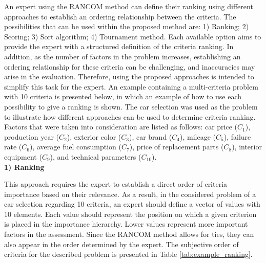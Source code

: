 An expert using the RANCOM method can define their ranking using different approaches to establish an ordering relationship between the criteria. The possibilities that can be used within the proposed method are: 1) Ranking; 2) Scoring; 3) Sort algorithm; 4) Tournament method. Each available option aims to provide the expert with a structured definition of the criteria ranking. In addition, as the number of factors in the problem increases, establishing an ordering relationship for these criteria can be challenging, and inaccuracies may arise in the evaluation. Therefore, using the proposed approaches is intended to simplify this task for the expert. An example containing a multi-criteria problem with 10 criteria is presented below, in which an example of how to use each possibility to give a ranking is shown. The car selection was used as the problem to illustrate how different approaches can be used to determine criteria ranking. Factors that were taken into consideration are listed as follows: car price ($C_{1}$), production year ($C_{2}$), exterior color ($C_{3}$), car brand ($C_{4}$), mileage ($C_{5}$), failure rate ($C_{6}$), average fuel consumption ($C_{7}$), price of replacement parts ($C_{8}$), interior equipment ($C_{9}$), and technical parameters ($C_{10}$). \\

\noindent \textbf{1) Ranking}

This approach requires the expert to establish a direct order of criteria importance based on their relevance. As a result, in the considered problem of a car selection regarding 10 criteria, an expert should define a vector of values with 10 elements. Each value should represent the position on which a given criterion is placed in the importance hierarchy. Lower values represent more important factors in the assessment. Since the RANCOM method allows for ties, they can also appear in the order determined by the expert. The subjective order of criteria for the described problem is presented in Table \ref{tab:example_ranking}. \\

